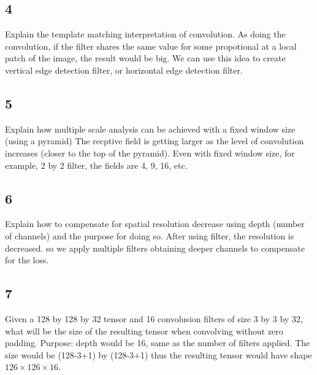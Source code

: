 \documentclass{article}
\begin{document}
\subsection*{4}
\begin{myleftlinebox}
    Explain the template matching interpretation of convolution.
    \tcblower
    As doing the convolution, if the filter shares the same value for some propotional at a local patch of the image, the result would be big. We can use this idea to create vertical edge detection filter, or horizontal edge detection filter.
\end{myleftlinebox}

\subsection*{5}
\begin{myleftlinebox}
    Explain how multiple scale analysis can be achieved with a fixed window size (using a pyramid)
    \tcbline
    The recptive field is getting larger as the level of convolution increases (closer to the top of the pyramid). Even with fixed window size, for example, 2 by 2 filter, the fields are 4, 9, 16, etc.
\end{myleftlinebox}

\subsection*{6}
\begin{myleftlinebox}
    Explain how to compensate for spatial resolution decrease using depth (number of channels) and the purpose for doing so.
    \tcblower
    After using filter, the resolution is decreased. so we apply multiple filters obtaining deeper channels to compensate for the loss.
\end{myleftlinebox}

\subsection*{7}
\begin{myleftlinebox}
    Given a 128 by 128 by 32 tensor and 16 convolusion filters of size 3 by 3 by 32, what will be the size of the resulting tensor when convolving without zero padding.
    \tcblower
    Purpose:
    depth would be 16, same as the number of filters applied. The size would be (128-3+1) by (128-3+1) thus the resulting tensor would have shape \(126\times 126\times 16\).
\end{myleftlinebox}
\end{document}
